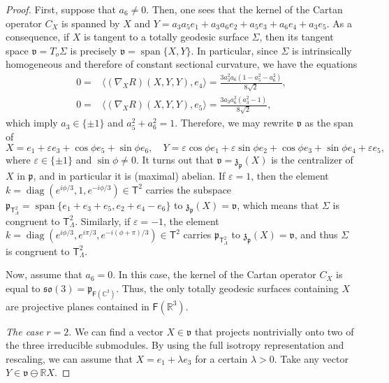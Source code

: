 \documentclass[11pt,a4paper,final]{amsart}
\newcommand{\s}{\mathsf}
\newcommand{\g}{\mathfrak}
\newcommand{\R}{\mathbb{R}}
\newcommand{\C}{\mathbb{C}}
\newcommand{\vecspan}{\operatorname{span}}
\theoremstyle{definition}
\begin{document}
\begin{proof}
	First, suppose that $a_{6}\neq 0$.
	Then, one sees that the kernel of the Cartan operator $C_{X}$ is spanned by $X$ and
	$Y=a_{3}a_{5}e_{1}+a_{3}a_{6}e_{2}+a_{5}e_{3}+a_{6}e_{4}+a_{3}e_{5}$.
	As a consequence, if $X$ is tangent to a totally geodesic surface $\Sigma$, then its tangent space $\g{v}=T_{o}\Sigma$ is precisely $\g{v}=\vecspan\{X,Y\}$.
	In particular, since $\Sigma$ is intrinsically homogeneous and therefore of constant sectional curvature, we have the equations
	\begin{equation*}
		\begin{aligned}
			0=&{}\langle (\nabla_{X}R)(X,Y,Y),e_{4} \rangle=\frac{3 a_{3}^{2} a_{6}(1-a_{5}^{2}-a_{6}^{2})}{8\sqrt{2}},\\
			0=&{}\langle (\nabla_{X}R)(X,Y,Y),e_{5} \rangle=\frac{3 a_{3} a_{6}^{2}(a_{3}^{2}-1)}{8\sqrt{2}},
		\end{aligned}
	\end{equation*}
	which imply $a_{3}\in \{\pm 1\}$ and $a_{5}^{2}+a_{6}^{2}=1$.
	Therefore, we may rewrite $\g{v}$ as the span of
	\begin{equation*}
		X=e_{1}+\varepsilon e_{3}+\cos \phi e_{5}+ \sin \phi e_{6}, \quad
		Y=\varepsilon \cos \phi e_{1}+\varepsilon \sin \phi e_{2}+\cos \phi e_{3}+\sin \phi e_{4}+\varepsilon e_{5},
	\end{equation*}
	where $\varepsilon\in\{\pm 1\}$ and $\sin \phi \neq 0$.
	It turns out that $\g{v}=\g{z}_{\g{p}}(X)$ is the centralizer of $X$ in $\g{p}$, and in particular it is (maximal) abelian.
	If $\varepsilon=1$, then the element $k=\operatorname{diag}(e^{i\phi/3},1,e^{-i\phi/3})\in \s{T}^2$
	carries the subspace $\g{p}_{\mathsf{T}^2_{\Lambda}}=\vecspan\{e_{1}+e_{3}+e_{5},e_{2}+e_{4}-e_{6}\}$ to $\g{z}_{\g{p}}(X)=\g{v}$, which means that $\Sigma$ is congruent to $\mathsf{T}^2_{\Lambda}$.
	Similarly, if $\varepsilon=-1$, the element $k=\operatorname{diag}(e^{i\phi/3},e^{i\pi/3},e^{-i(\phi+\pi)/3})\in\s{T}^{2}$
	carries $\g{p}_{\mathsf{T}^2_{\Lambda}}$ to $\g{z}_{\g{p}}(X)=\g{v}$, and thus $\Sigma$ is congruent to $\mathsf{T}^2_{\Lambda}$.
	
	Now, assume that $a_{6}=0$.
	In this case, the kernel of the Cartan operator $C_X$ is equal to $\g{so}(3)=\g{p}_{\s{F}(\C^3)}$.
	Thus, the only totally geodesic surfaces containing $X$ are projective planes contained in $\mathsf{F}(\R^{3})$.
	
	\textit{The case} $r=2$.
	We can find a vector $X\in \g{v}$ that projects nontrivially onto two of the three irreducible submodules.
	By using the full isotropy representation and rescaling, we can assume that $X=e_1+\lambda e_3$ for a certain $\lambda > 0$.
	Take any vector $Y\in \g{v}\ominus \R X$.
		

\end{proof}
\end{document}
